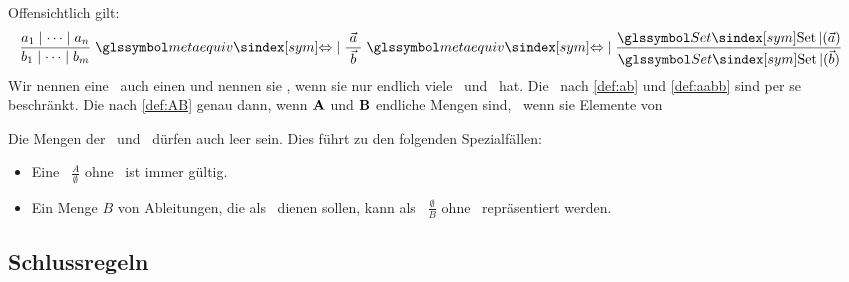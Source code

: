 Offensichtlich gilt:
\begin{align}
	& \frac{a_1 \srand \dots \srand a_n}{b_1 \srand \dots \srand b_m} \; \symmetaequiv \; \frac{\; \vec{a} \;}{\; \vec{b} \;} \; \symmetaequiv \; \frac{\symSet(\vec{a})}{\symSet(\vec{b})} \label{eq:AB}
\end{align}
Wir nennen eine \Schlussregel\ auch einen  und nennen sie , wenn sie nur endlich viele \Voraussetzungen\ und \Folgerungen\ hat.
Die \Schlussregeln\ nach \eqref{def:ab} und \eqref{def:aabb} sind per se beschränkt.
Die nach \eqref{def:AB} genau dann, wenn $\mathbf{A}$ und $\mathbf{B}$ endliche Mengen sind, \textdh\ wenn sie Elemente von

Die Mengen der \Voraussetzungen\ und \Folgerungen\ dürfen auch leer sein.
Dies führt zu den folgenden Spezialfällen:
\begin{itemize}
	\item[] Eine \Schlussregel\ $\frac{A}{\emptyset}$ ohne \Folgerungen\ ist immer gültig.
	\item[] Ein Menge $B$ von Ableitungen, die als \Axiome\ dienen sollen, kann als \Schlussregel\ $\frac{\emptyset}{B}$ ohne \Voraussetzungen\ repräsentiert werden.
\end{itemize}

\subsection{Schlussregeln}%
\label{sub:Schlussregeln}


